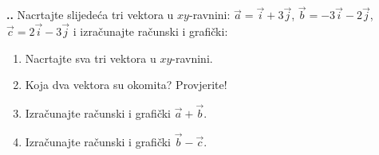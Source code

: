 

\noindent 
\textbf{
\thecjelina.\thezadatak.}
Nacrtajte slijedeća tri vektora u $xy$-ravnini: $\vec{a}=\vec{i}+3\vec{j}$, 
$\vec{b}=-3\vec{i}-2\vec{j}$, 
$\vec{c}=2\vec{i}-3\vec{j}$ 
i izračunajte računski i grafički:
\begin{enumerate}[label=\alph*)]
 \item Nacrtajte sva tri vektora u $xy$-ravnini.
 \item Koja dva vektora su okomita? Provjerite!
 \item Izračunajte računski i grafički $\vec{a} + \vec{b}$.
 \item Izračunajte računski i grafički $\vec{b} - \vec{c} $.
\end{enumerate}

